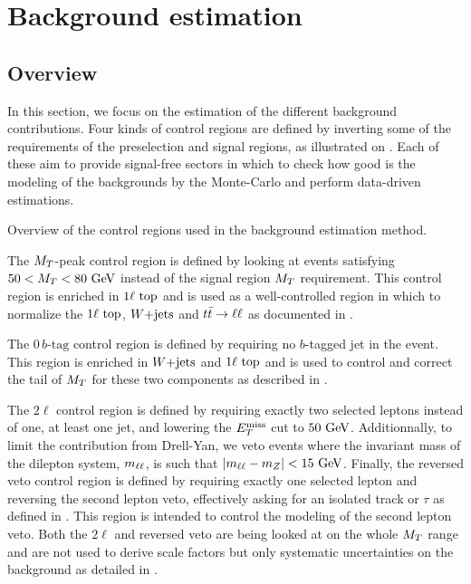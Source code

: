     \section{Background estimation \label{sec:analysis_backgroundEstimation}}

        \subsection{Overview}

    In this section, we focus on the estimation of the different background contributions.
    Four kinds of control regions are defined by inverting some of the requirements of the
    preselection and signal regions, as illustrated on .
    Each of these aim to provide signal-free sectors in which to check how good is the
    modeling of the backgrounds by the Monte-Carlo and perform data-driven estimations.

                     {Overview of the control regions used in the background estimation method. }

    The $M_T$-peak control region is defined by looking at events satisfying $50 < M_T <
    80~\text{GeV}$ instead of the signal region $M_T$ requirement. This control region is enriched
    in $1\ell~\text{top}$ and is used as a well-controlled region in which to normalize the
    $1\ell~\text{top}$, $\text{$W$+jets}$ and $t\bar{t} \rightarrow \ell \ell$ as documented in .

    The $0\, b\text{-tag}$ control region is defined by requiring no $b$-tagged jet in the
    event. This region is enriched in $\text{$W$+jets}$ and $1\ell~\text{top}$ and is used to control
    and correct the tail of $M_T$ for these two components as described in .

    The $2\ell$ control region is defined by requiring exactly two selected leptons instead
    of one, at least one jet, and lowering the $E_T^\text{miss}$ cut to $50 ~\text{GeV}$. Additionnally, to limit the
    contribution from Drell-Yan, we veto events where the invariant mass of the dilepton
    system, $m_{\ell\ell}$, is such that $\left|m_{\ell\ell} - m_{Z}\right| < 15 ~\text{GeV}$.
    Finally, the reversed veto control region is defined by requiring exactly one selected
    lepton and reversing the second lepton veto, effectively asking for an isolated track
    or $\tau$ as defined in . This region  is intended to control
    the modeling of the second lepton veto. Both the $2\ell$ and reversed veto are being
    looked at on the whole $M_T$ range and are not used to derive scale factors but only
    systematic uncertainties on the background as detailed in .

